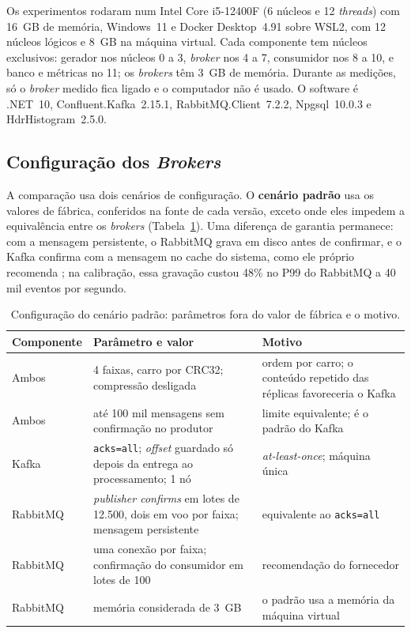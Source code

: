 \documentclass[12pt]{article}
\begin{document}
Os experimentos rodaram num Intel Core i5-12400F (6 núcleos e 12 \textit{threads}) com 16~GB de
memória, Windows~11 e Docker Desktop~4.91 sobre WSL2, com 12 núcleos lógicos e 8~GB na
máquina virtual. Cada componente tem núcleos exclusivos: gerador nos núcleos 0 a 3, \textit{broker}
nos 4 a 7, consumidor nos 8 a 10, e banco e métricas no 11; os \textit{brokers} têm 3~GB de memória.
Durante as medições, só o \textit{broker} medido fica ligado e o computador não é usado. O software
é .NET~10, Confluent.Kafka~2.15.1, RabbitMQ.Client~7.2.2, Npgsql~10.0.3 e
HdrHistogram~2.5.0.

\subsection{Configuração dos \textit{Brokers}}
\label{sec:configuracao}

A comparação usa dois cenários de configuração. O \textbf{cenário padrão} usa os valores
de fábrica, conferidos na fonte de cada versão, exceto onde eles impedem a equivalência
entre os \textit{brokers} (Tabela~\ref{tab:configuracao}). Uma diferença de garantia permanece: com
a mensagem persistente, o RabbitMQ grava em disco antes de confirmar, e o Kafka confirma
com a mensagem no cache do sistema, como ele próprio recomenda \cite{kafka:docs}; na
calibração, essa gravação custou 48\% no P99 do RabbitMQ a 40 mil eventos por segundo.

\begin{table}[ht]
\centering
\caption{Configuração do cenário padrão: parâmetros fora do valor de fábrica e o motivo.}
\label{tab:configuracao}
\small
\begin{tabular}{|p{2.2cm}|p{6.4cm}|p{5.3cm}|}
\hline
\textbf{Componente} & \textbf{Parâmetro e valor} & \textbf{Motivo} \\
\hline
Ambos & 4 faixas, carro por CRC32; compressão desligada & ordem por carro; o conteúdo repetido das réplicas favoreceria o Kafka \\
\hline
Ambos & até 100 mil mensagens sem confirmação no produtor & limite equivalente; é o padrão do Kafka \\
\hline
Kafka & \texttt{acks=all}; \textit{offset} guardado só depois da entrega ao processamento; 1 nó & \textit{at-least-once}; máquina única \\
\hline
RabbitMQ & \textit{publisher confirms} em lotes de 12.500, dois em voo por faixa; mensagem persistente & equivalente ao \texttt{acks=all} \\
\hline
RabbitMQ & uma conexão por faixa; confirmação do consumidor em lotes de 100 & recomendação do fornecedor \\
\hline
RabbitMQ & memória considerada de 3~GB & o padrão usa a memória da máquina virtual \\
\hline
\end{tabular}
\end{table}
\end{document}
